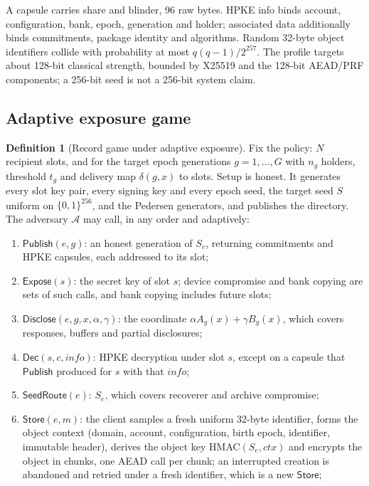 \documentclass[pdflatex,sn-mathphys-num]{sn-jnl}
\theoremstyle{plain}
\theoremstyle{definition}
\newtheorem{definition}[theorem]{Definition}
\begin{document}
A capsule carries share and blinder, 96 raw bytes. HPKE info binds account, configuration, bank, epoch, generation and holder; associated data additionally binds commitments, package identity and algorithms. Random 32-byte object identifiers collide with probability at most $q(q-1)/2^{257}$. The profile targets about 128-bit classical strength, bounded by X25519 and the 128-bit AEAD/PRF components; a 256-bit seed is not a 256-bit system claim.

\subsection{Adaptive exposure game}\label{sec:adaptive}
\begin{definition}[Record game under adaptive exposure]\label{def:adaptivegame}
Fix the policy: $N$ recipient slots, and for the target epoch generations $g=1,\dots,G$ with $n_g$ holders, threshold $t_g$ and delivery map $\delta(g,x)$ to slots. Setup is honest. It generates every slot key pair, every signing key and every epoch seed, the target seed $S$ uniform on $\{0,1\}^{256}$, and the Pedersen generators, and publishes the directory. The adversary $\mathcal A$ may call, in any order and adaptively:
\begin{enumerate}
\item $\mathsf{Publish}(e,g)$: an honest generation of $S_e$, returning commitments and HPKE capsules, each addressed to its slot;
\item $\mathsf{Expose}(s)$: the secret key of slot $s$; device compromise and bank copying are sets of such calls, and bank copying includes future slots;
\item $\mathsf{Disclose}(e,g,x,\alpha,\gamma)$: the coordinate $\alpha A_g(x)+\gamma B_g(x)$, which covers responses, buffers and partial disclosures;
\item $\mathsf{Dec}(s,c,\mathit{info})$: HPKE decryption under slot $s$, except on a capsule that $\mathsf{Publish}$ produced for $s$ with that $\mathit{info}$;
\item $\mathsf{SeedRoute}(e)$: $S_e$, which covers recoverer and archive compromise;
\item $\mathsf{Store}(e,m)$: the client samples a fresh uniform 32-byte identifier, forms the object context (domain, account, configuration, birth epoch, identifier, immutable header), derives the object key HMAC$(S_e,\mathit{ctx})$ and encrypts the object in chunks, one AEAD call per chunk; an interrupted creation is abandoned and retried under a fresh identifier, which is a new $\mathsf{Store}$;

\end{enumerate}
\end{definition}
\end{document}
